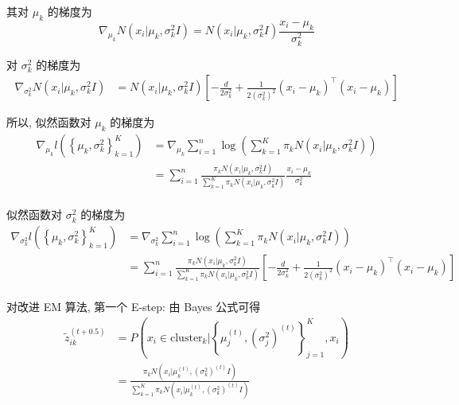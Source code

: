 \documentclass[openany]{ctexbook}
\theoremstyle{kaiti}
\theoremstyle{normal}
\begin{document}
其对 $\mu_k$ 的梯度为
\begin{equation}
  \nabla_{\mu_k}N(x_i|\mu_k,\sigma_k^2I)
  =N(x_i|\mu_k,\sigma_k^2I)\frac{x_i-\mu_k}{\sigma_k^2}
\end{equation}

对 $\sigma_k^2$ 的梯度为
\begin{equation}
  \begin{aligned}
    \nabla_{\sigma_k^2}N(x_i|\mu_k,\sigma_k^2I)
    &=N(x_i|\mu_k,\sigma_k^2I)\left[-\frac{d}{2\sigma_k^2}+\frac{1}{2(\sigma_k^2)^2}(x_i-\mu_k)^{\top}(x_i-\mu_k)\right]
  \end{aligned}
\end{equation}

所以, 似然函数对 $\mu_k$ 的梯度为
\begin{equation}
  \begin{aligned}
    \nabla_{\mu_k}l\left(\left\{\mu_k,\sigma_k ^2\right\}_{k=1}^K\right)
    &=\nabla_{\mu_k} \sum_{i=1}^n \log\left(\sum_{k=1}^K\pi_k N(x_i|\mu_k,\sigma_k^2I)\right)\\
    &=\sum_{i=1}^n\frac{\pi_k N(x_i|\mu_k,\sigma_k^2I)}{\displaystyle\sum_{k=1}^K\pi_k N(x_i|\mu_k,\sigma_k^2I)}\frac{x_i-\mu_k}{\sigma_k^2}\\
  \end{aligned}
\end{equation}

似然函数对 $\sigma_k^2$ 的梯度为
\begin{equation}
  \begin{aligned}
    \nabla_{\sigma_k^2}l\left(\left\{\mu_k,\sigma_k^2\right\}_{k=1}^K\right)
    &=\nabla_{\sigma_k^2} \sum_{i=1}^n \log\left(\sum_{k=1}^K\pi_k N(x_i|\mu_k,\sigma_k^2I)\right)\\
    &=\sum_{i=1}^n \frac{\pi_k N(x_i|\mu_k,\sigma_k^2I)}{\displaystyle\sum_{k=1}^K\pi_k N(x_i|\mu_k,\sigma_k^2I)}\left[-\frac{d}{2\sigma_k^2}+\frac{1}{2(\sigma_k^2)^2}(x_i-\mu_k)^{\top}(x_i-\mu_k)\right]\\
  \end{aligned}
\end{equation}

对改进 EM 算法, 第一个 E-step: 由 Bayes 公式可得
\begin{equation}
  \begin{aligned}
    \tilde{z}_{ik}^{(t+0.5)} 
    &=P\left(x_i\in \mathrm{cluster}_k \Big| \left\{\mu_j^{(t)},(\sigma_j^2)^{(t)}\right\}_{j=1}^K,x_i\right)\\
    &=\frac{\pi_k N\left(x_i\Big|\mu_k^{(t)},(\sigma_k^2)^{(t)}I\right)}{\displaystyle\sum_{k=1}^K\pi_k N\left(x_i\Big|\mu_k^{(t)},(\sigma_k^2)^{(t)}I\right)}
  \end{aligned}
\end{equation}
\end{document}
